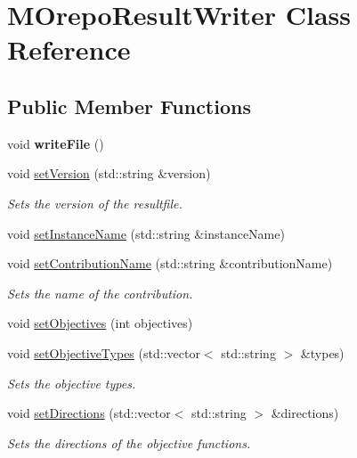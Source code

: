\hypertarget{class_m_orepo_result_writer}{}\section{M\+Orepo\+Result\+Writer Class Reference}
\label{class_m_orepo_result_writer}
\subsection*{Public Member Functions}
\begin{DoxyCompactItemize}
\item 
\mbox{\label{class_m_orepo_result_writer_ab1ed18edc6b5da8e56716da09c7fdb28}} 
void {\bfseries write\+File} ()
\item 
void \hyperlink{class_m_orepo_result_writer_a592ba40e1ff29b5734056a06b99a5c83}{set\+Version} (std\+::string \&version)
\begin{DoxyCompactList}\small\item\em Sets the version of the resultfile. \end{DoxyCompactList}\item 
void \hyperlink{class_m_orepo_result_writer_ac7d7814f7bb9716a46101e22fc38c1da}{set\+Instance\+Name} (std\+::string \&instance\+Name)
\item 
void \hyperlink{class_m_orepo_result_writer_adb06e067ac54ccfd2af8a5fdc53957dd}{set\+Contribution\+Name} (std\+::string \&contribution\+Name)
\begin{DoxyCompactList}\small\item\em Sets the name of the contribution. \end{DoxyCompactList}\item 
void \hyperlink{class_m_orepo_result_writer_a1135d9cfb96df6420f178e02b11323ff}{set\+Objectives} (int objectives)
\item 
void \hyperlink{class_m_orepo_result_writer_a31f71009c36802c9543790e3b57dfad6}{set\+Objective\+Types} (std\+::vector$<$ std\+::string $>$ \&types)
\begin{DoxyCompactList}\small\item\em Sets the objective types. \end{DoxyCompactList}\item 
void \hyperlink{class_m_orepo_result_writer_a6c67d6025d87c81e261bfbf051e71c89}{set\+Directions} (std\+::vector$<$ std\+::string $>$ \&directions)
\begin{DoxyCompactList}\small\item\em Sets the directions of the objective functions. \end{DoxyCompactList}\item 

\end{DoxyCompactItemize}

